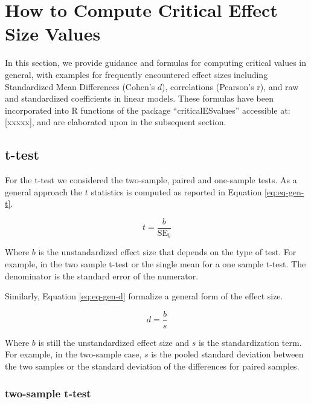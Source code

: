 \documentclass[
  man]{apa7}
\begin{document}
\hypertarget{how-to-compute-critical-effect-size-values}{%
\section{How to Compute Critical Effect Size Values}\label{how-to-compute-critical-effect-size-values}}

In this section, we provide guidance and formulas for computing critical values in general, with examples for frequently encountered effect sizes including Standardized Mean Differences (Cohen's \(d\)), correlations (Pearson's r), and raw and standardized coefficients in linear models. These formulas have been incorporated into R functions of the package ``criticalESvalues'' accessible at: {[}xxxxx{]}, and are elaborated upon in the subsequent section.

\hypertarget{t-test}{%
\subsection{t-test}\label{t-test}}

For the t-test we considered the two-sample, paired and one-sample tests. As a general approach the \(t\) statistics is computed as reported in Equation \eqref{eq:eq-gen-t}.

\begin{equation}
    \label{eq:eq-gen-t}
    t = \frac{b}{\text{SE}_{b}}
\end{equation}

Where \(b\) is the unstandardized effect size that depends on the type of test. For example, in the two sample t-test or the single mean for a one sample t-test. The denominator is the standard error of the numerator.

Similarly, Equation \eqref{eq:eq-gen-d} formalize a general form of the effect size.

\begin{equation}
    \label{eq:eq-gen-d}
    d = \frac{b}{s}
\end{equation}

Where \(b\) is still the unstandardized effect size and \(s\) is the standardization term. For example, in the two-sample case, \(s\) is the pooled standard deviation between the two samples or the standard deviation of the differences for paired samples.

\hypertarget{two-sample-t-test}{%
\subsubsection{two-sample t-test}\label{two-sample-t-test}}
\end{document}
